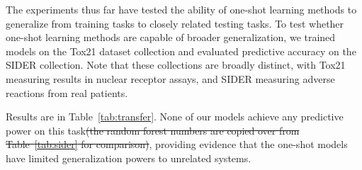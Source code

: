 \documentclass[journal=jacsat,manuscript=article]{achemso}
\providecommand{\DIFdeltex}[1]{{\protect\color{red}\sout{#1}}}                      %
\providecommand{\DIFdelbegin}{} %
\providecommand{\DIFdelend}{} %
\providecommand{\DIFdel}[1]{\texorpdfstring{\DIFdeltex{#1}}{}} %
\begin{document}
The experiments thus far have tested the ability of one-shot learning methods to generalize from training tasks to closely related testing tasks. To test whether one-shot learning methods are capable of broader generalization, we trained models on the Tox21 dataset collection and evaluated predictive accuracy on the SIDER collection. Note that these collections are broadly distinct, with Tox21 measuring results in nuclear receptor assays, and SIDER measuring adverse reactions from real patients.

Results are in Table~\ref{tab:transfer}. None of our models achieve any predictive power on this task\DIFdelbegin \DIFdel{(the random forest numbers are copied over from Table~\ref{tab:sider} for comparison)}\DIFdelend , providing evidence that the one-shot models have limited generalization powers to unrelated systems.
\end{document}
